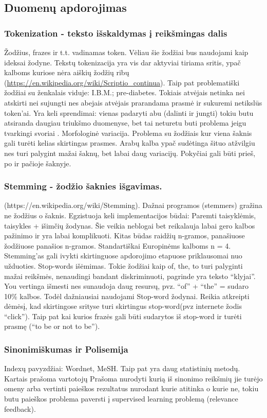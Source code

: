 \documentclass{VUMIFInfKursinis}
\begin{document}
\subsection{Duomenų apdorojimas}
\subsubsection{Tokenization - teksto išskaldymas į reikšmingas dalis}
Žodžius, frazes ir t.t. vadinamas token. Vėliau šie žodžiai bus naudojami kaip ideksai žodyne. Tekstų tokenizacija yra vis dar aktyviai tiriama sritis, ypač kalboms kuriose nėra aiškių žodžių ribų (\url{https://en.wikipedia.org/wiki/Scriptio_continua}). Taip pat problematiški žodžiai su ženkalais viduje: I.B.M.; pre-diabetes. Tokiais atvėjais netinka nei atskirti nei sujungti nes abejais atvėjais prarandama prasmė ir sukuremi netikslūs token’ai. Yra keli sprendimai: vienas padaryti abu (dalinti ir jungti) tokiu butu atsiranda daugiau triukšmo duomenyse, bet tai neturetu buti problema jeigu tvarkingi svoriai . 
Morfologinė variacija. Problema su žodžiais kur viena šaknis gali turėti kelias skirtingas prasmes. Arabų kalba ypač sudėtinga šituo atžvilgiu nes turi palygint mažai šaknų, bet labai daug variacijų. Pokyčiai gali būti prieš, po ir pačioje šaknyje.

\subsubsection{Stemming - žodžio šaknies išgavimas.}
(https://en.wikipedia.org/wiki/Stemming). Dažnai programos (stemmers) gražina ne žodžius o šaknis. Egzistuoja keli implementacijos būdai: Paremti taisyklėmis, taisykles + išimčių žodynas. Šie veikia neblogai bet reikalauja labai gero kalbos pažinimo ir yra labai komplikuoti. Kitas būdas raidžių n-gramos, panašiuose žodžiuose panašios n-gramos. Standartiškai Europinėms kalboms n = 4. Stemming’as gali ivykti skirtinguose apdorojimo etapuose priklausomai nuo užduoties.
Stop-words išėmimas. Tokie žodžiai kaip of, the, to turi palyginti mažai reikšmės, nenaudingi bandant diskriminuoti, pagrinde yra teksto “klyjai”. You vertinga išmesti nes sunaudoja daug resursų, pvz. “of” + “the” = sudaro 10\% kalbos. Todėl dažniausiai naudojami Stop-word žodynai. Reikia atkreipti dėmėsį, kad skirtingose srityse turi skirtingus stop-word(pvz internete žodis “click”). Taip pat kai kurios frazės gali būti sudarytos iš stop-word ir turėti prasmę (“to be or not to be”).
\subsubsection{Sinonimiškumas ir Polisemija}
Indexų pavyzdžiai: Wordnet, MeSH. Taip pat yra daug statistinių metodų. Kartais prašoma vartotojų Prašoma nurodyti kurią iš sinonimo reikšmių jie turėjo omeny arba vertinti paieškos rezultatus nurodant kurie atitinka o kurie ne, tokiu butu paieškos problema paversti į supervised learning problemą (relevance feedback).
\end{document}
